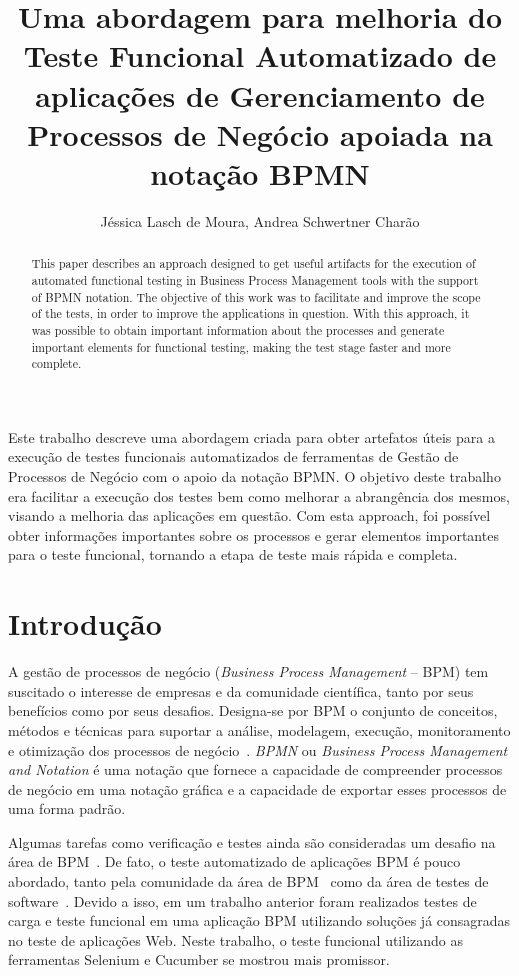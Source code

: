 \documentclass[12pt]{article}
\title{Uma abordagem para melhoria do Teste Funcional Automatizado de aplicações de Gerenciamento de Processos de Negócio apoiada na notação BPMN}
\author{Jéssica Lasch de Moura\inst{1}, Andrea Schwertner Charão\inst{1}}
\begin{document}
 

\maketitle

\begin{abstract}
This paper describes an approach designed to get useful artifacts for the execution of automated functional testing in Business Process Management tools with the support of BPMN notation. The objective of this work was to facilitate and improve the scope of the tests, in order to improve the applications in question. With this approach, it was possible to obtain important information about the processes and generate important elements for functional testing, making the test stage faster and more complete.
\end{abstract}
     
\begin{resumo} 
Este trabalho descreve uma abordagem criada para obter artefatos úteis para a execução de testes funcionais automatizados de ferramentas de Gestão de Processos de Negócio com o apoio da notação BPMN. O objetivo deste trabalho era facilitar a execução dos testes bem como melhorar a abrangência dos mesmos, visando a melhoria das aplicações em questão. Com esta approach, foi possível obter informações importantes sobre os processos e gerar elementos importantes para o teste funcional, tornando a etapa de teste mais rápida e completa.
\end{resumo}

\section{Introdução}

A gestão de processos de negócio (\emph{Business Process Management} -- BPM) tem suscitado o interesse de empresas e da comunidade científica, tanto por seus benefícios como por seus desafios. Designa-se por BPM o conjunto de conceitos, métodos e técnicas para suportar a análise, modelagem, execução, monitoramento e otimização dos processos de negócio~\cite{weske}. \emph{BPMN} ou \emph{Business Process Management and Notation} é uma notação que fornece a capacidade de compreender processos de negócio em uma notação gráfica e a capacidade de exportar esses processos de uma forma padrão\cite{bpmn}.

Algumas tarefas como verificação e testes ainda são consideradas um desafio na área de BPM~\cite{aalst2013survey}. De fato, o teste automatizado de aplicações BPM é pouco abordado, tanto pela comunidade da área de BPM~\cite{weske} como da área de testes de software~\cite{graham2012experiences}. Devido a isso, em um trabalho anterior \cite{sbqs2015} foram realizados testes de carga e teste funcional em uma aplicação BPM utilizando soluções já consagradas no teste de aplicações Web. Neste trabalho, o teste funcional utilizando as ferramentas Selenium e Cucumber se mostrou mais promissor.
\end{document}
